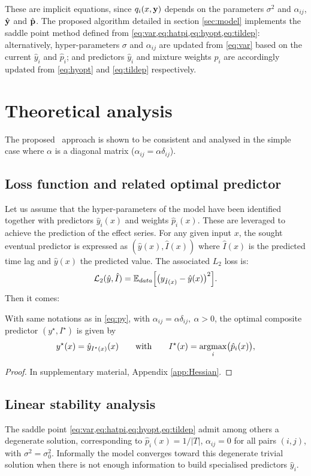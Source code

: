 These are implicit equations, since $q_i(x,{\bf y})$ depends on the parameters $\sigma^2$ and $\alpha_{ij}$, $\hat {\bf y}$ and $\hat{\bf p}$.
The proposed algorithm detailed in section \ref{sec:model} implements the saddle point method defined from \cref{eq:var,eq:hatpi,eq:hyopt,eq:tildep}: 
alternatively, hyper-parameters $\sigma$ and $\alpha_{ij}$ are updated from \cref{eq:var} based on the current $\hat y_i$ and $\hat p_i$; 
and predictors $\hat y_i$ and mixture weights  $\hat p_i$ are accordingly updated from \cref{eq:hyopt} and \cref{eq:tildep} respectively. 

\section{Theoretical analysis}\label{sec-theory}
The proposed \XX\ approach is shown to be consistent and analysed in the simple case  where $\alpha$ is a diagonal matrix ($\alpha_{ij} = \alpha\delta_{ij}$).

\subsection{Loss function and related optimal predictor}\label{sec:prop}
Let us assume that the hyper-parameters of the model have been identified together with predictors $\hat  y_i(x)$ and weights $\hat p_i(x)$. These are leveraged to achieve the prediction of the effect series. 
For any given input $x$, the sought eventual predictor is expressed as $(\hat y(x),\hat I(x))$ where $\hat I(x)$ is the predicted time lag %
and $\hat y(x)$ the 
predicted value. The associated $L_2$ loss is: 
\begin{equation}\label{eq:orloss}
{\cal L}_2(\hat y,\hat I) = {\mathbb E}_{data}\Bigl[\bigl(y_{\hat I(x)}-\hat y(x)\bigr)^2\Bigr]. 
\end{equation}
Then it comes:
\begin{prop}\label{prop:opred}
With same notations as in \cref{eq:py}, with $\alpha_{ij} = \alpha\delta_{ij},\ \alpha>0$, the optimal composite predictor 
$(y^\star,I^\star)$ is given by
\[
y^\star(x) = \hat y_{I^\star(x)}(x)\qquad\text{with}\qquad I^\star(x) = \operatorname*{argmax}_{i} \bigl(\hat p_i(x)\bigr), 
\]
\end{prop}
\begin{proof}
In supplementary material, Appendix \ref{app:Hessian}.
\end{proof}

\subsection{Linear stability analysis}\label{sec:stability}
The saddle point \cref{eq:var,eq:hatpi,eq:hyopt,eq:tildep} admit among others a degenerate solution, corresponding 
to $\hat p_i(x) = 1/\vert T\vert$, $\alpha_{ij}=0$ for all pairs $(i,j)$, with $\sigma^2=\sigma_0^2$. Informally the model converges toward this degenerate trivial solution when there is not enough information to build specialised predictors $\hat y_i$. 

